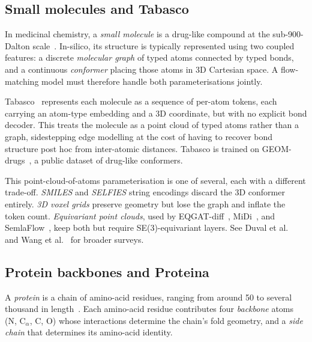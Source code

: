 \documentclass[12pt,a4paper,twoside]{report}
\begin{document}
\subsection{Small molecules and Tabasco}
\label{sec:small-mol}

In medicinal chemistry, a \emph{small molecule} is a drug-like compound at the sub-900-Dalton scale~\cite{NIHSmallMolGuide}. In-silico, its structure is typically represented using two coupled features: a discrete \emph{molecular graph} of typed atoms connected by typed bonds, and a continuous \emph{conformer} placing those atoms in 3D Cartesian space. A flow-matching model must therefore handle both parameterisations jointly.

Tabasco~\cite{Tabasco} represents each molecule as a sequence of per-atom tokens, each carrying an atom-type embedding and a 3D coordinate, but with no explicit bond decoder. This treats the molecule as a point cloud of typed atoms rather than a graph, sidestepping edge modelling at the cost of having to recover bond structure post hoc from inter-atomic distances. Tabasco is trained on GEOM-drugs~\cite{GEOMdrugs}, a public dataset of drug-like conformers.

This point-cloud-of-atoms parameterisation is one of several, each with a different trade-off. \emph{SMILES} and \emph{SELFIES} string encodings discard the 3D conformer entirely. \emph{3D voxel grids} preserve geometry but lose the graph and inflate the token count. \emph{Equivariant point clouds}, used by EQGAT-diff~\cite{EQGATdiff}, MiDi~\cite{MiDi}, and SemlaFlow~\cite{SemlaFlow}, keep both but require SE(3)-equivariant layers. See Duval et al.~\cite{HitchhikersGuide} and Wang et al.~\cite{MoleculeDiffusionSurvey} for broader surveys.
\subsection{Protein backbones and Proteina}
\label{sec:protein}

A \emph{protein} is a chain of amino-acid residues, ranging from around 50 to several thousand in length~\cite{BritannicaProtein}. Each amino-acid residue contributes four \emph{backbone} atoms (N, C$_\alpha$, C, O) whose interactions determine the chain's fold geometry, and a \emph{side chain} that determines its amino-acid identity.
\end{document}
